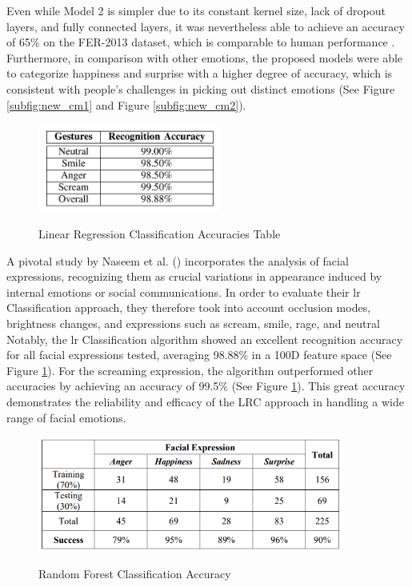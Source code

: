\indent Even while Model 2 is simpler due to its constant kernel size, lack of dropout layers, and fully connected layers, it was nevertheless able to achieve an accuracy of 65\% on the FER-2013 dataset, which is comparable to human performance \citep{agrawal_2019_using}.
Furthermore, in comparison with other emotions, the proposed models were able to categorize happiness and surprise with a higher degree of accuracy, which is consistent with people's challenges in picking out distinct emotions (See Figure \ref{subfig:new_cm1} and Figure \ref{subfig:new_cm2}).
\begin{figure}[H]
    \centering
    \includegraphics[width=6cm]{Images/lr_result.png}
    \caption{Linear Regression Classification Accuracies Table} \footnotesize{\citep{naseem_2010_linear}}
    \label{fig:lrc_result}
\end{figure}
\indent A pivotal study by Naseem et al. (\citeyear{naseem_2010_linear}) incorporates the analysis of facial expressions, recognizing them as crucial variations in appearance induced by internal emotions or social communications.
In order to evaluate their \gls{lr} Classification approach, they therefore took into account occlusion modes, brightness changes, and expressions such as scream, smile, rage, and neutral
Notably, the \gls{lr} Classification algorithm showed an excellent recognition accuracy for all facial expressions tested, averaging 98.88\% in a 100D feature space (See Figure \ref{fig:lrc_result}). 
For the screaming expression, the algorithm outperformed other accuracies by achieving an accuracy of 99.5\% (See Figure \ref{fig:lrc_result}).
This great accuracy demonstrates the reliability and efficacy of the LRC approach in handling a wide range of facial emotions.
\begin{figure}[H]
    \centering
    \includegraphics[width=10cm]{Images/rf_result.png}
    \caption{Random Forest Classification Accuracy} \footnotesize{\citep{munasinghe_2018_facial}}
    \label{fig:rf_result}
\end{figure}
